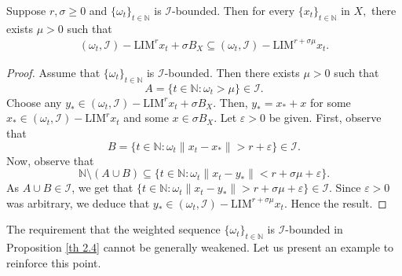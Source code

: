 \documentclass[reqno]{amsart}
\begin{document}
{\begin{proposition}\label{th 2.4}
	Suppose $r,\sigma \ge 0$ and $\{\omega_t\}_{t\in\mathbb{N}}$ is $\mathcal{I}$-bounded. Then for every $\{x_t\}_{t\in\mathbb{N}}$ in $X,$ there exists  $\mu>0$ such that
	\begin{eqnarray*}(\omega_t,\mathcal{I})-\text{LIM}^r x_t + \sigma {B}_X\subseteq (\omega_t,\mathcal{I})-\text{LIM}^{r+\sigma \mu}x_t.
	\end{eqnarray*}
\end{proposition}
\begin{proof}
	Assume that $\{\omega_t\}_{t\in\mathbb{N}}$ is $\mathcal{I}$-bounded. Then there exists $\mu>0$ such that 
$$
A=\{t\in \mathbb{N} : \omega_t>\mu\}\in\mathcal{I}.
$$  
Choose any $y_*\in(\omega_t,\mathcal{I})-\text{LIM}^r x_t + \sigma {B}_X$. Then, $y_*=x_*+x$ for some  $x_*\in(\omega_t,\mathcal{I})-\text{LIM}^r x_t$ and some $x\in \sigma {B}_X$. Let $\varepsilon>0$ be given. First, observe that
 $$
 B=\{t\in \mathbb{N} : \omega_t\|x_t-x_*\|>r+\varepsilon\}\in\mathcal{I}.
 $$ 
 Now, observe that 
	 $$
	 \mathbb{N}\setminus(A\cup B)\subseteq \{t\in \mathbb{N} : \omega_t\|x_t-y_*\|<r+\sigma \mu+\varepsilon\}.
	 $$
	As $A\cup B\in\mathcal{I}$, we get that $\{t\in \mathbb{N} : \omega_t\|x_t-y_*\|> r+\sigma \mu+\varepsilon\}\in\mathcal{I}$.
	 Since $\varepsilon>0$ was arbitrary, we deduce that $y_*\in(\omega_t,\mathcal{I})-\text{LIM}^{r+\sigma \mu}x_t$. Hence the result.\end{proof}
 
The requirement that the weighted sequence $\{\omega_t\}_{t\in\mathbb{N}}$ is $\mathcal{I}$-bounded in Proposition \ref{th 2.4} cannot be generally weakened. Let us present an example to reinforce this point.

}
\end{document}

